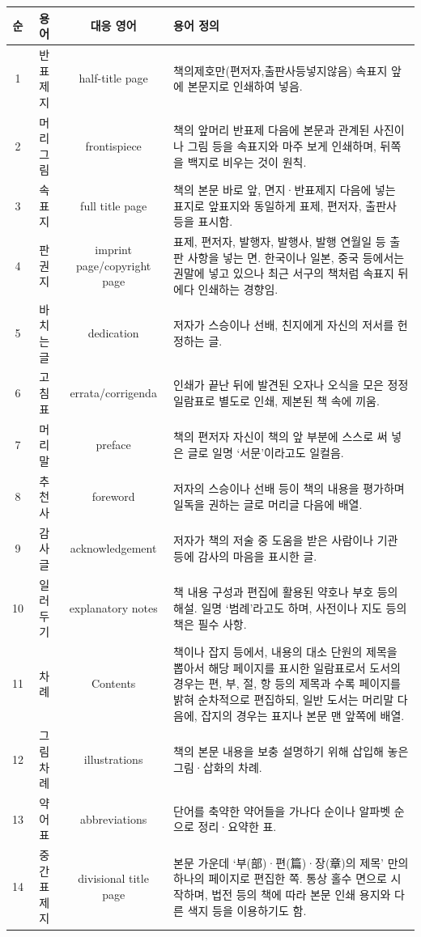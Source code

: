 \documentclass[
  letterpaper,
]{book}
\begin{document}
\hypertarget{tbl-glossary}{}
\begin{longtable}{cccl}

\toprule
순 & 용 어 & 대응 영어 & 용어 정의 \\ 
\midrule
1 & 반표제지 & half-title page & 책의제호만(편저자,출판사등넣지않음) 속표지 앞에 본문지로 인쇄하여 넣음. \\ 
2 & 머리그림 & frontispiece & 책의 앞머리 반표제 다음에 본문과 관계된 사진이나 그림 등을 속표지와 마주 보게 인쇄하며, 뒤쪽을 백지로 비우는 것이 원칙. \\ 
3 & 속표지 & full title page & 책의 본문 바로 앞, 면지·반표제지 다음에 넣는 표지로 앞표지와 동일하게 표제, 편저자, 출판사 등을 표시함. \\ 
4 & 판권지 & imprint page/copyright page & 표제, 편저자, 발행자, 발행사, 발행 연월일 등 출판 사항을 넣는 면. 한국이나 일본, 중국 등에서는 권말에 넣고 있으나 최근 서구의 책처럼 속표지 뒤에다 인쇄하는 경향임. \\ 
5 & 바치는 글 & dedication & 저자가 스승이나 선배, 친지에게 자신의 저서를 헌정하는 글. \\ 
6 & 고침표 & errata/corrigenda & 인쇄가 끝난 뒤에 발견된 오자나 오식을 모은 정정 일람표로 별도로 인쇄, 제본된 책 속에 끼움. \\ 
7 & 머리말 & preface & 책의 편저자 자신이 책의 앞 부분에 스스로 써 넣은 글로 일명 ‘서문’이라고도 일컬음. \\ 
8 & 추천사 & foreword & 저자의 스승이나 선배 등이 책의 내용을 평가하며 일독을 권하는 글로 머리글 다음에 배열. \\ 
9 & 감사글 & acknowledgement & 저자가 책의 저술 중 도움을 받은 사람이나 기관 등에 감사의 마음을 표시한 글. \\ 
10 & 일러두기 & explanatory notes & 책 내용 구성과 편집에 활용된 약호나 부호 등의 해설. 일명 ‘범례’라고도 하며, 사전이나 지도 등의 책은 필수 사항. \\ 
11 & 차례 & Contents & 책이나 잡지 등에서, 내용의 대소 단원의 제목을 뽑아서 해당 페이지를 표시한 일람표로서 도서의 경우는 편, 부, 절, 항 등의 제목과 수록 페이지를 밝혀 순차적으로 편집하되, 일반 도서는 머리말 다음에, 잡지의 경우는 표지나 본문 맨 앞쪽에 배열. \\ 
12 & 그림 차례 & illustrations & 책의 본문 내용을 보충 설명하기 위해 삽입해 놓은 그림·삽화의 차례. \\ 
13 & 약어표 & abbreviations & 단어를 축약한 약어들을 가나다 순이나 알파벳 순으로 정리·요약한 표. \\ 
14 & 중간 표제지 & divisional title page & 본문 가운데 ‘부(部)·편(篇)·장(章)의 제목’ 만의 하나의 페이지로 편집한 쪽. 통상 홀수 면으로 시작하며, 법전 등의 책에 따라 본문 인쇄 용지와 다른 색지 등을 이용하기도 함. \\ 

\end{longtable}
\end{document}
